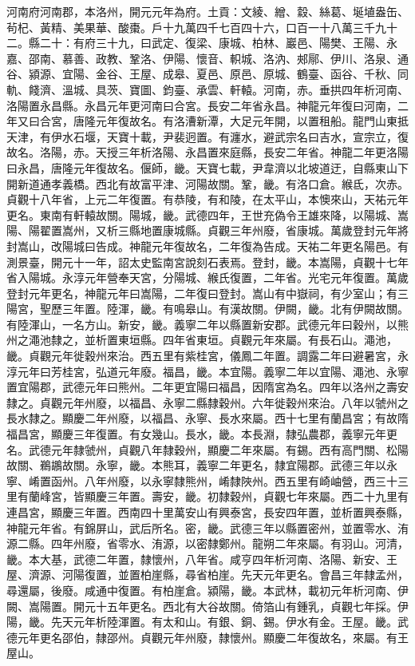 \begin{pinyinscope}
 河南府河南郡，本洛州，開元元年為府。土貢：文綾、繒、縠、絲葛、埏埴盎缶、茍杞、黃精、美果華、酸棗。戶十九萬四千七百四十六，口百一十八萬三千九十二。縣二十：有府三十九，曰武定、復梁、康城、柏林、巖邑、陽樊、王陽、永嘉、邵南、慕善、政教、鞏洛、伊陽、懷音、軹城、洛汭、郟鄏、伊川、洛泉、通谷、潁源、宜陽、金谷、王屋、成皋、夏邑、原邑、原城、鶴臺、函谷、千秋、同軌、餞濟、溫城、具茨、寶圖、鈞臺、承雲、軒轅。河南，赤。垂拱四年析河南、洛陽置永昌縣。永昌元年更河南曰合宮。長安二年省永昌。神龍元年復曰河南，二年又曰合宮，唐隆元年復故名。有洛漕新潭，大足元年開，以置租船。龍門山東抵天津，有伊水石堰，天寶十載，尹裴迥置。有瀍水，避武宗名曰吉水，宣宗立，復故名。洛陽，赤。天授三年析洛陽、永昌置來庭縣，長安二年省。神龍二年更洛陽曰永昌，唐隆元年復故名。偃師，畿。天寶七載，尹韋濟以北坡道迂，自縣東山下開新道通孝義橋。西北有故富平津、河陽故關。鞏，畿。有洛口倉。緱氐，次赤。貞觀十八年省，上元二年復置。有恭陵，有和陵，在太平山，本懊來山，天祐元年更名。東南有軒轅故關。陽城，畿。武德四年，王世充偽令王雄來降，以陽城、嵩陽、陽翟置嵩州，又析三縣地置康城縣。貞觀三年州廢，省康城。萬歲登封元年將封嵩山，改陽城曰告成。神龍元年復故名，二年復為告成。天祐二年更名陽邑。有測景臺，開元十一年，詔太史監南宮說刻石表焉。登封，畿。本嵩陽，貞觀十七年省入陽城。永淳元年營奉天宮，分陽城、緱氏復置，二年省。光宅元年復置。萬歲登封元年更名，神龍元年曰嵩陽，二年復曰登封。嵩山有中嶽祠，有少室山；有三陽宮，聖歷三年置。陸渾，畿。有鳴皋山。有漢故關。伊闕，畿。北有伊闕故關。有陸渾山，一名方山。新安，畿。義寧二年以縣置新安郡。武德元年曰穀州，以熊州之澠池隸之，並析置東垣縣。四年省東垣。貞觀元年來屬。有長石山。澠池，畿。貞觀元年徙穀州來治。西五里有紫桂宮，儀鳳二年置。調露二年曰避暑宮，永淳元年曰芳桂宮，弘道元年廢。福昌，畿。本宜陽。義寧二年以宜陽、澠池、永寧置宜陽郡，武德元年曰熊州。二年更宜陽曰福昌，因隋宮為名。四年以洛州之壽安隸之。貞觀元年州廢，以福昌、永寧二縣隸穀州。六年徙穀州來治。八年以虢州之長水隸之。顯慶二年州廢，以福昌、永寧、長水來屬。西十七里有蘭昌宮；有故隋福昌宮，顯慶三年復置。有女幾山。長水，畿。本長淵，隸弘農郡，義寧元年更名。武德元年隸虢州，貞觀八年隸穀州，顯慶二年來屬。有錫。西有高門關、松陽故關、鵜鶘故關。永寧，畿。本熊耳，義寧二年更名，隸宜陽郡。武德三年以永寧、崤置函州。八年州廢，以永寧隸熊州，崤隸陜州。西五里有崎岫營，西三十三里有蘭峰宮，皆顯慶三年置。壽安，畿。初隸穀州，貞觀七年來屬。西二十九里有連昌宮，顯慶三年置。西南四十里萬安山有興泰宮，長安四年置，並析置興泰縣，神龍元年省。有錦屏山，武后所名。密，畿。武德三年以縣置密州，並置零水、洧源二縣。四年州廢，省零水、洧源，以密隸鄭州。龍朔二年來屬。有羽山。河清，畿。本大基，武德二年置，隸懷州，八年省。咸亨四年析河南、洛陽、新安、王屋、濟源、河陽復置，並置柏崖縣，尋省柏崖。先天元年更名。會昌三年隸孟州，尋還屬，後廢。咸通中復置。有柏崖倉。潁陽，畿。本武林，載初元年析河南、伊闕、嵩陽置。開元十五年更名。西北有大谷故關。倚箔山有鍾乳，貞觀七年採。伊陽，畿。先天元年析陸渾置。有太和山。有銀、銅、錫。伊水有金。王屋。畿。武德元年更名邵伯，隸邵州。貞觀元年州廢，隸懷州。顯慶二年復故名，來屬。有王屋山。




\end{pinyinscope}
